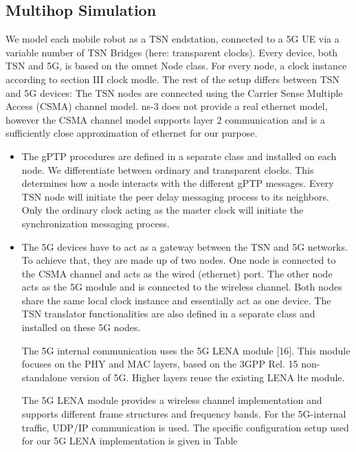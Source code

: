 \documentclass[english]{cccconf}
\begin{document}
\subsection{Multihop Simulation}
We model each mobile robot as a TSN endstation, connected to a 5G UE via a variable number of TSN Bridges (here: transparent clocks). Every device, both TSN and 5G, is based on the omnet Node class. For every node, a clock instance according to section III clock modle. The rest of the setup differs between TSN and 5G devices:
The TSN nodes are connected using the Carrier Sense Multiple Access (CSMA) channel model. ns-3 does not provide a real ethernet model, however the CSMA channel model supports layer 2 communication and is a sufficiently close approximation of ethernet for our purpose.
\begin{itemize}
	\item The gPTP procedures are defined in a separate class and installed on each node. We differentiate between ordinary and transparent clocks. This determines how a node interacts with the different gPTP messages. Every TSN node will initiate the peer delay messaging process to its neighbors. Only the ordinary clock acting as the master clock will initiate the synchronization messaging process.
	\item The 5G devices have to act as a gateway between the TSN and 5G networks. To achieve that, they are made up of two nodes. One node is connected to the CSMA channel and acts as the wired (ethernet) port. The other node acts as the 5G module and is connected to the wireless channel. Both nodes share the same local clock instance and essentially act as one device. The TSN translator functionalities are also defined in a separate class and installed on these 5G nodes.
	
	The 5G internal communication uses the 5G LENA module [16]. This module focuses on the PHY and MAC layers, based on the 3GPP Rel. 15 non-standalone version of 5G. Higher layers reuse the existing LENA lte module.
	
	The 5G LENA module provides a wireless channel implementation and supports different frame structures and frequency bands. For the 5G-internal traffic, UDP/IP communication is used. The specific configuration setup used for our 5G LENA implementation is given in Table
\end{itemize}




\end{document}

